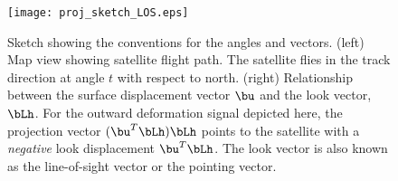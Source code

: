  
\begin{figure}
\centering
\texttt{[image: proj\_sketch\_LOS.eps]}
\caption[]
{{
Sketch showing the conventions for the angles and vectors.
(left) Map view showing satellite flight path. The satellite flies in the track direction at angle $t$ with respect to north.
(right) Relationship between the surface displacement vector $\bu$ and the look vector, $\bLh$.
For the outward deformation signal depicted here, the projection vector $(\bu^T\bLh)\bLh$ points to the satellite with a {\em negative} look displacement $\bu^T\bLh$.
The look vector is also known as the line-of-sight vector or the pointing vector.
\label{proj}
}}
\end{figure}
